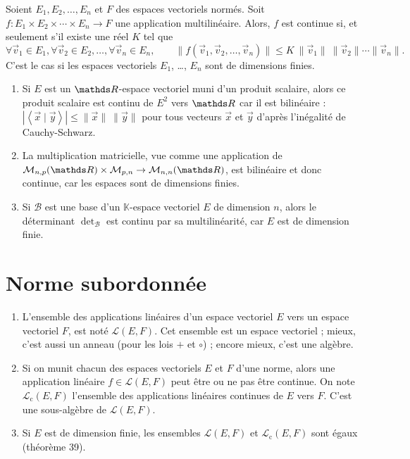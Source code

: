 \begin{prop}
	Soient $E_1, E_2, \ldots, E_n$\/ et $F$\/ des espaces vectoriels normés. Soit $f : E_1 \times E_2 \times \cdots \times E_n \to F$\/ une application multilinéaire.
	Alors, $f$\/ est continue si, et seulement s'il existe une réel $K$\/ tel que \[
		\forall \vec{v}_1 \in E_1, \forall \vec{v}_2 \in E_2, \ldots, \forall \vec{v}_n \in E_n,
		\quad\quad \|f(\vec{v}_1, \vec{v}_2, \ldots, \vec{v}_n)\| \le K\:\|\vec{v}_1\|\: \|\vec{v}_2\| \cdots \|\vec{v}_n\|
	.\]
	C'est le cas si les espaces vectoriels $E_1$, \ldots, $E_n$ sont de dimensions finies.
\end{prop}

\begin{exm}
	\begin{enumerate}
		\item Si $E$\/ est un $\R$-espace vectoriel muni d'un produit scalaire, alors ce produit scalaire est continu de $E^2$\/ vers $\R$\/ car il est bilinéaire : $|{\left<\vec{x} \mid \vec{y} \right>}| \le \|\vec{x}\|\: \|\vec{y}\|$\/ pour tous vecteurs $\vec{x}$\/ et $\vec{y}$\/ d'après l'inégalité de Cauchy-Schwarz.
		\item La multiplication matricielle, vue comme une application de $\mathcal{M}_{n,p}(\R) \times \mathcal{M}_{p,n} \to \mathcal{M}_{n,n}(\R)$, est bilinéaire et donc continue, car les espaces sont de dimensions finies.
		\item Si $\mathcal{B}$\/ est une base d'un $\mathds{K}$-espace vectoriel $E$ de dimension $n$, alors le déterminant $\det_\mathcal{B}$\/ est continu par sa multilinéarité, car $E$\/ est de dimension finie.
	\end{enumerate}
\end{exm}

\section{Norme subordonnée}

\begin{rmk}
	\begin{enumerate}
		\item L'ensemble des applications linéaires d'un espace vectoriel $E$\/ vers un espace vectoriel $F$, est noté $\mathcal{L}(E, F)$. Cet ensemble est un espace vectoriel ; mieux, c'est aussi un anneau (pour les lois $+$\/ et $\circ$) ; encore mieux, c'est une algèbre.
		\item Si on munit chacun des espaces vectoriels $E$\/ et $F$\/ d'une norme, alors une application linéaire $f \in \mathcal{L}(E, F)$\/ peut être ou ne pas être continue. On note $\mathcal{L}_\mathrm{c}(E, F)$\/ l'ensemble des applications linéaires continues de $E$ vers $F$. C'est une sous-algèbre de $\mathcal{L}(E, F)$.
		\item Si $E$ est de dimension finie, les ensembles $\mathcal{L}(E, F)$\/ et $\mathcal{L}_\mathrm{c}(E, F)$\/ sont égaux (théorème 39).
	\end{enumerate}
\end{rmk}

